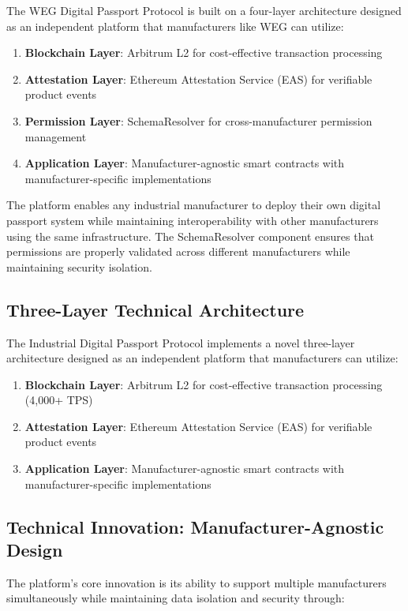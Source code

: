 \documentclass[11pt,a4paper]{article}
\begin{document}
The WEG Digital Passport Protocol is built on a four-layer architecture designed as an independent platform that manufacturers like WEG can utilize:

\begin{enumerate}
    \item \textbf{Blockchain Layer}: Arbitrum L2 for cost-effective transaction processing
    \item \textbf{Attestation Layer}: Ethereum Attestation Service (EAS) for verifiable product events
    \item \textbf{Permission Layer}: SchemaResolver for cross-manufacturer permission management
    \item \textbf{Application Layer}: Manufacturer-agnostic smart contracts with manufacturer-specific implementations
\end{enumerate}

The platform enables any industrial manufacturer to deploy their own digital passport system while maintaining interoperability with other manufacturers using the same infrastructure. The SchemaResolver component ensures that permissions are properly validated across different manufacturers while maintaining security isolation.

\subsection{Three-Layer Technical Architecture}

The Industrial Digital Passport Protocol implements a novel three-layer architecture designed as an independent platform that manufacturers can utilize:

\begin{enumerate}
    \item \textbf{Blockchain Layer}: Arbitrum L2 for cost-effective transaction processing (4,000+ TPS)
    \item \textbf{Attestation Layer}: Ethereum Attestation Service (EAS) for verifiable product events
    \item \textbf{Application Layer}: Manufacturer-agnostic smart contracts with manufacturer-specific implementations
\end{enumerate}

\subsection{Technical Innovation: Manufacturer-Agnostic Design}

The platform's core innovation is its ability to support multiple manufacturers simultaneously while maintaining data isolation and security through:
\end{document}
